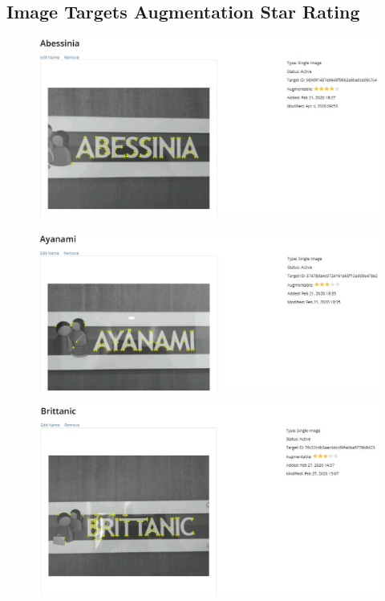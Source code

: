 \documentclass{aifyp}
\begin{document}
\begin{appendices}
\section{Image Targets Augmentation Star Rating}
\begin{figure}[H]
    \centering
        \begin{minipage}{.5\textwidth}
          \centering
          \includegraphics[scale=0.3]{Images/Chapter6/AbessiniaImageTarget.JPG}
          \label{fig:AbessiniaImageTarget}
        \end{minipage}%
        \begin{minipage}{.5\textwidth}
          \centering
          \includegraphics[scale=0.3]{Images/Chapter6/AyanamiImageTarget.JPG}
          \label{fig:AyanamiImageTarget}
        \end{minipage}
\end{figure}
\begin{figure}[H]
    \centering
        \begin{minipage}{.5\textwidth}
          \centering
          \includegraphics[scale=0.3]{Images/Chapter6/BrittanicImageTargets.JPG}

\end{minipage}
\end{figure}
\end{appendices}
\end{document}
